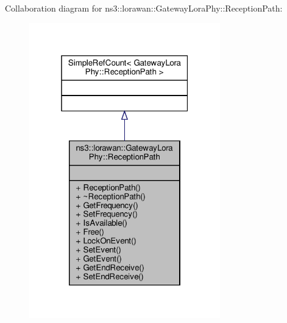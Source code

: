 Collaboration diagram for ns3\+:\+:lorawan\+:\+:Gateway\+Lora\+Phy\+:\+:Reception\+Path\+:
\nopagebreak
\begin{figure}[H]
\begin{center}
\leavevmode
\includegraphics[width=235pt]{classns3_1_1lorawan_1_1GatewayLoraPhy_1_1ReceptionPath__coll__graph}
\end{center}
\end{figure}
